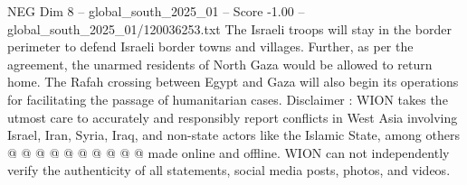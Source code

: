 \begin{textsample}{NEG Dim 8 – global\_south\_2025\_01 – Score -1.00 – global\_south\_2025\_01/120036253.txt}
The Israeli troops will stay in the border perimeter to defend Israeli border towns and villages.
Further, as per the agreement, the unarmed residents of North Gaza would be allowed to return home.
The Rafah crossing between Egypt and Gaza will also begin its operations for facilitating the passage of humanitarian cases.
Disclaimer : WION takes the utmost care to accurately and responsibly report conflicts in West Asia involving Israel, Iran, Syria, Iraq, and non-state actors like the Islamic State, among others @ @ @ @ @ @ @ @ @ @ made online and offline.
WION can not independently verify the authenticity of all statements, social media posts, photos, and videos.

\end{textsample}
